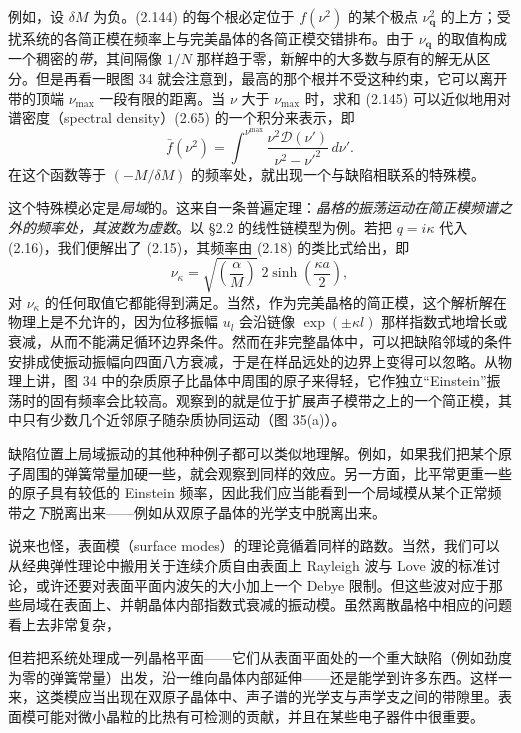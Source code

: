 例如，设 $\delta M$ 为负。(2.144) 的每个根必定位于 $f(\nu^2)$ 的某个极点 $\nu^2_{\mathbf{q}}$ 的上方；受扰系统的各简正模在频率上与完美晶体的各简正模交错排布。由于 $\nu_{\mathbf{q}}$ 的取值构成一个稠密的\emph{带}，其间隔像 $1/N$ 那样趋于零，新解中的大多数与原有的解无从区分。但是再看一眼图 34 就会注意到，最高的那个根并不受这种约束，它可以离开带的顶端 $\nu_{\max}$ 一段有限的距离。当 $\nu$ 大于 $\nu_{\max}$ 时，求和 (2.145) 可以近似地用对谱密度（spectral density）(2.65) 的一个积分来表示，即
\begin{equation*}
\bar{f}(\nu^2)=\int^{\nu^{\max}}\frac{\nu^2\mathcal{D}(\nu')}{\nu^2-\nu'^2}\,d\nu'.
\tag{2.146}
\end{equation*}
在这个函数等于 $(-M/\delta M)$ 的频率处，就出现一个与缺陷相联系的特殊模。

这个特殊模必定是\emph{局域}的。这来自一条普遍定理：\emph{晶格的振荡运动在简正模频谱之外的频率处，其波数为虚数}。以 §2.2 的线性链模型为例。若把 $q=i\kappa$ 代入 (2.16)，我们便解出了 (2.15)，其频率由 (2.18) 的类比式给出，即
\begin{equation*}
\nu_{\kappa}=\sqrt{\left(\frac{\alpha}{M}\right)}\;2\sinh\left(\frac{\kappa a}{2}\right),
\tag{2.147}
\end{equation*}
对 $\nu_{\kappa}$ 的任何取值它都能得到满足。当然，作为完美晶格的简正模，这个解析解在物理上是不允许的，因为位移振幅 $u_l$ 会沿链像 $\exp(\pm\kappa l)$ 那样指数式地增长或衰减，从而不能满足循环边界条件。然而在非完整晶体中，可以把缺陷邻域的条件安排成使振动振幅向四面八方衰减，于是在样品远处的边界上变得可以忽略。从物理上讲，图 34 中的杂质原子比晶体中周围的原子来得轻，它作独立“Einstein”振荡时的固有频率会比较高。观察到的就是位于扩展声子模带之上的一个简正模，其中只有少数几个近邻原子随杂质协同运动（图 35(a)）。

缺陷位置上局域振动的其他种种例子都可以类似地理解。例如，如果我们把某个原子周围的弹簧常量加硬一些，就会观察到同样的效应。另一方面，比平常更重一些的原子具有较低的 Einstein 频率，因此我们应当能看到一个局域模从某个正常频带之\emph{下}脱离出来——例如从双原子晶体的光学支中脱离出来。

说来也怪，表面模（surface modes）的理论竟循着同样的路数。当然，我们可以从经典弹性理论中搬用关于连续介质自由表面上 Rayleigh 波与 Love 波的标准讨论，或许还要对表面平面内波矢的大小加上一个 Debye 限制。但这些波对应于那些局域在表面上、并朝晶体内部指数式衰减的振动模。虽然离散晶格中相应的问题看上去非常复杂，


但若把系统处理成一列晶格平面——它们从表面平面处的一个重大缺陷（例如劲度为零的弹簧常量）出发，沿一维向晶体内部延伸——还是能学到许多东西。这样一来，这类模应当出现在双原子晶体中、声子谱的光学支与声学支之间的带隙里。表面模可能对微小晶粒的比热有可检测的贡献，并且在某些电子器件中很重要。

